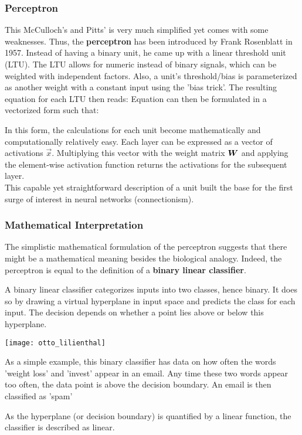 \subsubsection{Perceptron}
This McCulloch's and Pitts' is very much simplified yet comes with some weaknesses.
Thus, the \textbf{perceptron} has been introduced by Frank Rosenblatt in 1957.
Instead of having a binary unit, he came up with a linear threshold unit (LTU).
The LTU allows for numeric instead of binary signals, which can be weighted with independent factors.
Also, a unit's threshold/bias is parameterized as another weight with a constant input using the 'bias trick'.
The resulting equation for each LTU then reads:
Equation  can then be formulated in a vectorized form such that:

In this form, the calculations for each unit become mathematically and computationally relatively easy.
Each layer can be expressed as a vector of activations $\vec{x}$.
Multiplying this vector with the weight matrix $\boldsymbol{W}$ and applying the element-wise activation function returns the activations for the subsequent layer.\\
This capable yet straightforward description of a unit built the base for the first surge of interest in neural networks (connectionism).

\subsubsection{Mathematical Interpretation}
The simplistic mathematical formulation of the perceptron suggests that there might be a mathematical meaning besides the biological analogy.
Indeed, the perceptron is equal to the definition of a \textbf{binary linear classifier}.

A binary linear classifier categorizes inputs into two classes, hence binary.
It does so by drawing a virtual hyperplane in input space and predicts the class for each input.
The decision depends on whether a point lies above or below this hyperplane.
\begin{marginfigure}
    \texttt{[image: otto\_lilienthal]}
    \caption[]{As a simple example, this binary classifier has data on how often the words 'weight loss' and 'invest' appear in an email.
Any time these two words appear too often, the data point is above the decision boundary. An email is then classified as 'spam'}
\end{marginfigure}
As the hyperplane (or decision boundary) is quantified by a linear function, the classifier is described as linear.

